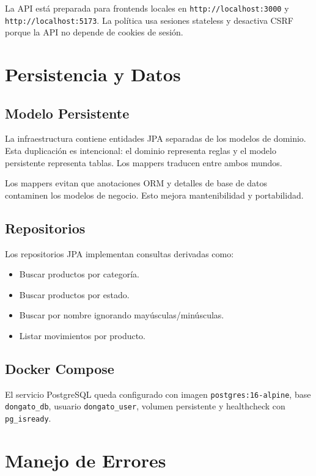 \documentclass[11pt,oneside]{report}
\begin{document}
La API está preparada para frontends locales en \texttt{http://localhost:3000} y \texttt{http://localhost:5173}. La política usa sesiones stateless y desactiva CSRF porque la API no depende de cookies de sesión.

\chapter{Persistencia y Datos}

\section{Modelo Persistente}

La infraestructura contiene entidades JPA separadas de los modelos de dominio. Esta duplicación es intencional: el dominio representa reglas y el modelo persistente representa tablas. Los mappers traducen entre ambos mundos.

\begin{infobox}
Los mappers evitan que anotaciones ORM y detalles de base de datos contaminen los modelos de negocio. Esto mejora mantenibilidad y portabilidad.
\end{infobox}

\section{Repositorios}

Los repositorios JPA implementan consultas derivadas como:

\begin{itemize}
  \item Buscar productos por categoría.
  \item Buscar productos por estado.
  \item Buscar por nombre ignorando mayúsculas/minúsculas.
  \item Listar movimientos por producto.
\end{itemize}

\section{Docker Compose}

El servicio PostgreSQL queda configurado con imagen \texttt{postgres:16-alpine}, base \texttt{dongato\_db}, usuario \texttt{dongato\_user}, volumen persistente y healthcheck con \texttt{pg\_isready}.

\chapter{Manejo de Errores}
\end{document}
